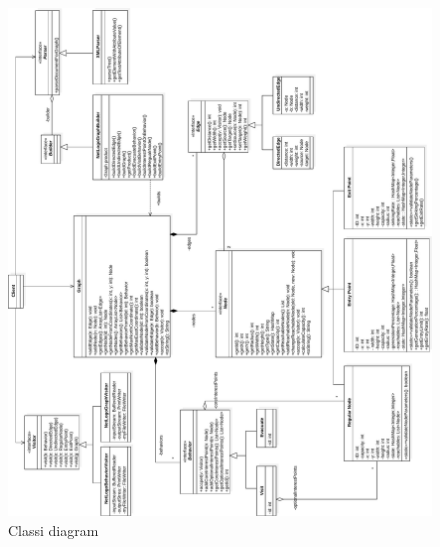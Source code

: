 \begin{figure}[htbp]
\centering
\includegraphics[width=\textwidth,height=\textheight,keepaspectratio]{images/complete-diagram.pdf}
\caption{Classi diagram}
\label{fig:complete-diagram}
\end{figure}
